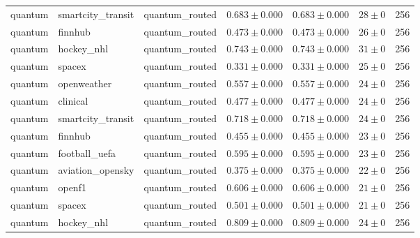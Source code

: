 \begin{table}[htbp]
\begin{tabular}{l l l r r r r}
quantum & smartcity\_transit & quantum\_routed & $0.683\pm0.000$ & $0.683\pm0.000$ & $28\pm0$ & 256 \\
quantum & finnhub & quantum\_routed & $0.473\pm0.000$ & $0.473\pm0.000$ & $26\pm0$ & 256 \\
quantum & hockey\_nhl & quantum\_routed & $0.743\pm0.000$ & $0.743\pm0.000$ & $31\pm0$ & 256 \\
quantum & spacex & quantum\_routed & $0.331\pm0.000$ & $0.331\pm0.000$ & $25\pm0$ & 256 \\
quantum & openweather & quantum\_routed & $0.557\pm0.000$ & $0.557\pm0.000$ & $24\pm0$ & 256 \\
quantum & clinical & quantum\_routed & $0.477\pm0.000$ & $0.477\pm0.000$ & $24\pm0$ & 256 \\
quantum & smartcity\_transit & quantum\_routed & $0.718\pm0.000$ & $0.718\pm0.000$ & $24\pm0$ & 256 \\
quantum & finnhub & quantum\_routed & $0.455\pm0.000$ & $0.455\pm0.000$ & $23\pm0$ & 256 \\
quantum & football\_uefa & quantum\_routed & $0.595\pm0.000$ & $0.595\pm0.000$ & $23\pm0$ & 256 \\
quantum & aviation\_opensky & quantum\_routed & $0.375\pm0.000$ & $0.375\pm0.000$ & $22\pm0$ & 256 \\
quantum & openf1 & quantum\_routed & $0.606\pm0.000$ & $0.606\pm0.000$ & $21\pm0$ & 256 \\
quantum & spacex & quantum\_routed & $0.501\pm0.000$ & $0.501\pm0.000$ & $21\pm0$ & 256 \\
quantum & hockey\_nhl & quantum\_routed & $0.809\pm0.000$ & $0.809\pm0.000$ & $24\pm0$ & 256 \\
\hline
\end{tabular}
\end{table}
